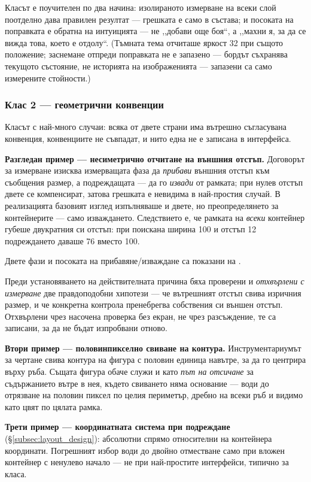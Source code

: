 Класът е поучителен по два начина: изолираното измерване на всеки слой поотделно дава правилен
резултат --- грешката е само в състава; и посоката на поправката е обратна на интуицията --- не
,,добави още боя“, а ,,махни я, за да се вижда това, което е отдолу“. (Тъмната тема отчиташе яркост
32 при същото положение; заснемане отпреди поправката не е запазено --- бордът съхранява текущото
състояние, не историята на изображенията --- запазени са само измерените стойности.)

\subsubsection{Клас 2 --- геометрични конвенции}

Класът с най-много случаи: всяка от двете страни има вътрешно съгласувана конвенция, конвенциите не
съвпадат, и нито една не е записана в интерфейса.

\textbf{Разгледан пример --- несиметрично отчитане на външния отстъп.} Договорът за измерване
изисква измерващата фаза да \emph{прибави} външния отстъп към съобщения размер, а подреждащата ---
да го \emph{извади} от рамката; при нулев отстъп двете се компенсират, затова грешката е невидима
в най-простия случай. В реализацията базовият изглед изпълняваше и двете, но преопределянето за
контейнерите --- само изваждането. Следствието е, че рамката на \emph{всеки} контейнер губеше
двукратния си отстъп: при поискана ширина 100 и отстъп 12 подреждането даваше 76 вместо 100.

Двете фази и посоката на прибавяне/изваждане са показани на .

Преди установяването на действителната причина бяха проверени и \emph{отхвърлени с измерване} две
правдоподобни хипотези --- че вътрешният отстъп свива изричния размер, и че конкретна контрола
пренебрегва собствения си външен отстъп. Отхвърлени чрез насочена проверка без екран, не чрез
разсъждение, те са записани, за да не бъдат изпробвани отново.

\textbf{Втори пример --- половинпикселно свиване на контура.} Инструментариумът за чертане свива
контура на фигура с половин единица навътре, за да го центрира върху ръба. Същата фигура обаче служи
и като \emph{път на отсичане} за съдържанието вътре в нея, където свиването няма основание --- води
до отрязване на половин пиксел по целия периметър, дребно на всеки ръб и видимо като цвят по цялата
рамка.

\textbf{Трети пример --- координатната система при подреждане} (§\ref{subsec:layout_design}):
абсолютни спрямо относителни на контейнера координати. Погрешният избор води до двойно отместване
само при вложен контейнер с ненулево начало --- не при най-простите интерфейси, типично за класа.

